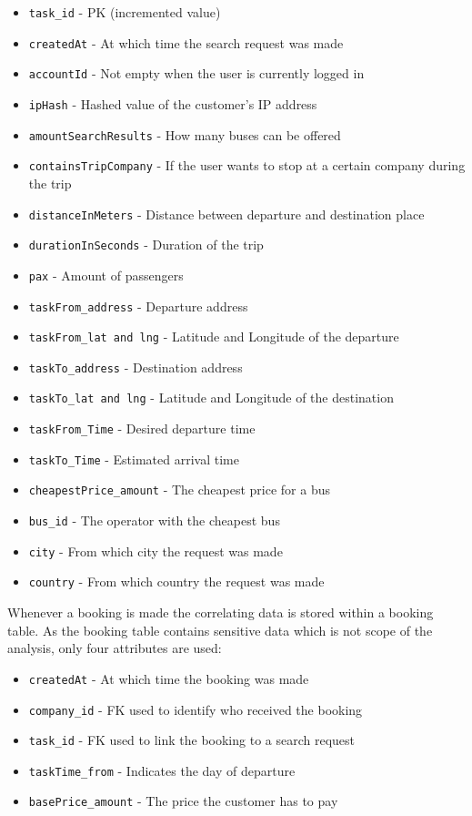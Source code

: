 \begin{itemize}
  \item \verb|task_id| - PK (incremented value) 
  \item \verb|createdAt| - At which time the search request was made
  \item \verb|accountId| - Not empty when the user is currently logged in
   \item \verb|ipHash| - Hashed value of the customer's IP address
  \item \verb|amountSearchResults| - How many buses can be offered
  \item \verb|containsTripCompany| - If the user wants to stop at a certain company during the trip
  \item \verb|distanceInMeters|  - Distance between departure and destination place
  \item \verb|durationInSeconds| - Duration of the trip
  \item \verb|pax|  - Amount of passengers
  \item \verb|taskFrom_address| - Departure address 
  \item \verb|taskFrom_lat and lng| - Latitude and Longitude of the departure
  \item \verb|taskTo_address|  - Destination address
  \item \verb|taskTo_lat and lng| - Latitude and Longitude of the destination
  \item \verb|taskFrom_Time|  - Desired departure time 
  \item \verb|taskTo_Time|  - Estimated arrival time
  \item \verb|cheapestPrice_amount| - The cheapest price for a bus
  \item \verb|bus_id| - The operator with the cheapest bus
  \item \verb|city| - From which city the request was made
  \item \verb|country| - From which country the request was made
\end{itemize}

Whenever a booking is made the correlating data is stored within a booking table. As the booking table contains sensitive data which is not scope of the analysis, only four attributes are used: 

\begin{itemize}
	\item \verb|createdAt| - At which time the booking was made
	\item \verb|company_id| - FK used to identify who received the booking
	\item \verb|task_id| - FK used to link the booking to a search request 
	\item \verb|taskTime_from| - Indicates the day of departure
	\item \verb|basePrice_amount| - The price the customer has to pay
\end{itemize} 

